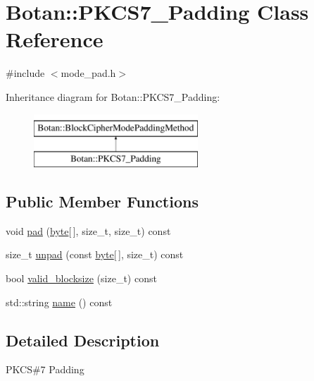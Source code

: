 \hypertarget{classBotan_1_1PKCS7__Padding}{\section{Botan\-:\-:P\-K\-C\-S7\-\_\-\-Padding Class Reference}
\label{classBotan_1_1PKCS7__Padding}
}


{\ttfamily \#include $<$mode\-\_\-pad.\-h$>$}

Inheritance diagram for Botan\-:\-:P\-K\-C\-S7\-\_\-\-Padding\-:\begin{figure}[H]
\begin{center}
\leavevmode
\includegraphics[height=2.000000cm]{classBotan_1_1PKCS7__Padding}
\end{center}
\end{figure}
\subsection*{Public Member Functions}
\begin{DoxyCompactItemize}
\item 
void \hyperlink{classBotan_1_1PKCS7__Padding_affba3107036108263906e0e704c02143}{pad} (\hyperlink{namespaceBotan_a7d793989d801281df48c6b19616b8b84}{byte}\mbox{[}$\,$\mbox{]}, size\-\_\-t, size\-\_\-t) const 
\item 
size\-\_\-t \hyperlink{classBotan_1_1PKCS7__Padding_a64ad1c901d16cc7179b7f3c35c8e1de0}{unpad} (const \hyperlink{namespaceBotan_a7d793989d801281df48c6b19616b8b84}{byte}\mbox{[}$\,$\mbox{]}, size\-\_\-t) const 
\item 
bool \hyperlink{classBotan_1_1PKCS7__Padding_aa2dfd809e5501597ccf084565c854e42}{valid\-\_\-blocksize} (size\-\_\-t) const 
\item 
std\-::string \hyperlink{classBotan_1_1PKCS7__Padding_a2ff0d658e6ff44c72f21becd195a9b0a}{name} () const 
\end{DoxyCompactItemize}


\subsection{Detailed Description}
P\-K\-C\-S\#7 Padding 


